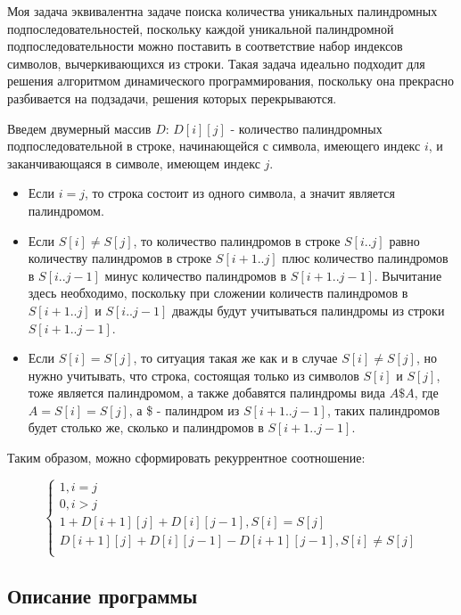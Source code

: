 \documentclass[12pt]{article}
\begin{document}
Моя задача эквивалентна задаче поиска количества уникальных палиндромных подпоследовательностей, поскольку каждой уникальной палиндромной подпоследовательности можно поставить в соответствие набор индексов символов, вычеркивающихся из строки. Такая задача идеально подходит для решения алгоритмом динамического программирования, поскольку она прекрасно разбивается на подзадачи, решения которых перекрываются. 

Введем двумерный массив $D$: $D[i][j]$ - количество палиндромных подпоследовательной в строке, начинающейся с символа, имеющего индекс $i$, и заканчивающаяся в символе, имеющем индекс $j$.

\begin{itemize}
    \item Если $i = j$, то строка состоит из одного символа, а значит является палиндромом.
    
    \item Если $S[i] \neq S[j]$, то количество палиндромов в строке $S[i..j]$ равно количеству палиндромов в строке $S[i + 1..j]$ плюс количество палиндромов в $S[i..j - 1]$ минус количество палиндромов в $S[i + 1..j - 1]$. Вычитание здесь необходимо, поскольку при сложении количеств палиндромов в $S[i + 1..j]$ и $S[i..j - 1]$ дважды будут учитываться палиндромы из строки $S[i + 1..j - 1]$. 
    
    \item Если $S[i] = S[j]$, то ситуация такая же как и в случае $S[i] \neq S[j]$, но нужно учитывать, что строка, состоящая только из символов $S[i]$ и $S[j]$, тоже является палиндромом, а также добавятся палиндромы вида $A\$A$, где $A = S[i] = S[j]$, а \$ - палиндром из $S[i + 1..j - 1]$, таких палиндромов будет столько же, сколько и палиндромов в $S[i + 1..j - 1]$.
\end{itemize}

Таким образом, можно сформировать рекуррентное соотношение:

$$\left\{
  \begin{array}{cc}
     1, i = j \\
     0, i > j \\
     1 + D[i + 1][j] + D[i][j - 1] , S[i] = S[j] \\
     D[i + 1][j] + D[i][j - 1] - D[i + 1][j - 1], S[i] \neq S[j] \\
  \end{array}
\right.$$

\subsection*{Описание программы}
\end{document}
